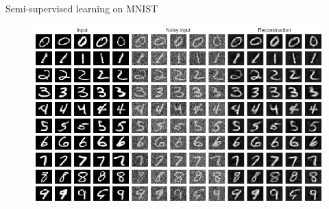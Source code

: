 \documentclass[aspectratio=169]{beamer}
\begin{document}
\begin{frame}{Semi-supervised learning on MNIST}
\begin{figure}
    \centering
	\includegraphics[height=0.90\textheight]{img/autoencoder/reconstructions.png}
\end{figure}
\end{frame}
\end{document}
